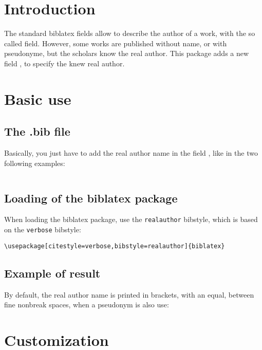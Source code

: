 \documentclass{ltxdockit}[2011/03/25]
\newcommand{\biblatex}{biblatex\xspace}
\newcommand{\namebibstyle}[1]{\texttt{#1}}
\begin{document}
\printtitlepage
\tableofcontents
\section{Introduction}

The standard biblatex fields allow to describe the author of a work, with the so called  field. However, some works are published without name, or with pseudonyme, but the scholars know the real author. This package adds a new field , to specify the knew real author.

\section{Basic use}

\subsection{The .bib file}
Basically, you just have to add the real author name in the field , like in the two following examples: 

\inputminted{tex}{example.bib}

\subsection{Loading of the \biblatex package}

When loading the \biblatex package, use the \namebibstyle{realauthor}  bibstyle, which is based on the \namebibstyle{verbose} bibstyle:

\begin{verbatim}
\usepackage[citestyle=verbose,bibstyle=realauthor]{biblatex}
\end{verbatim}

\subsection{Example of result}

By default, the real author name is printed in brackets, with an equal, between fine nonbreak spaces,  when a pseudonym is also use:
\begin{quotation}
\cite{LeClerc1686}

\cite{Simon1686}
\end{quotation}

\section{Customization}
\end{document}
